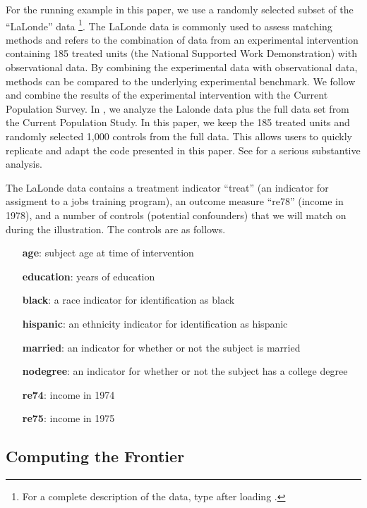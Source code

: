 \documentclass[nojss]{jss}
\begin{document}
For the running example in this paper, we use a randomly selected
subset of the ``LaLonde'' data \citep{lalonde1986,
  dehejia1999}\footnote{For a complete description of the data, type
   after loading .}. The LaLonde
data is commonly used to assess matching methods and refers to the
combination of data from an experimental intervention containing 185
treated units (the National Supported Work Demonstration) with
observational data. By combining the experimental data with
observational data, methods can be compared to the underlying
experimental benchmark. We follow \citet{lalonde1986} and combine the
results of the experimental intervention with the Current Population
Survey. In \citet{kingND}, we analyze the Lalonde data plus the full
data set from the Current Population Study. In this paper, we keep
the 185 treated units and randomly selected 1,000 controls from the 
full data. This allows users to quickly replicate and adapt the
code presented in this paper. See \citet{kingND} for a serious
substantive analysis. 

The LaLonde data contains a treatment indicator ``treat'' (an
indicator for assigment to a jobs training program), an outcome
measure ``re78'' (income in 1978), and a number of controls (potential
confounders) that we will match on during the illustration. The
controls are as follows.

\begin{itemize}
  \item[\textbf{age}:] subject age at time of intervention
  \item[\textbf{education}:] years of education
  \item[\textbf{black}:] a race indicator for identification as black
  \item[\textbf{hispanic}:] an ethnicity indicator for identification as hispanic
  \item[\textbf{married}:] an indicator for whether or not the subject is married
  \item[\textbf{nodegree}:] an indicator for whether or not the subject has a college degree
  \item[\textbf{re74}:] income in 1974
  \item[\textbf{re75}:] income in 1975
\end{itemize}

\subsection{Computing the Frontier}
\end{document}
